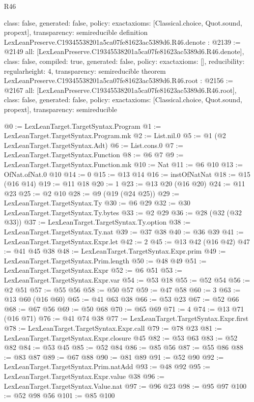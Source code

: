 \begin{lexlean}{R46}
\begin{coremodule}
{  class: false,
  generated: false,
  policy: exact{axioms: [Classical.choice, Quot.sound, propext]},
  transparency: semireducible
}
definition LexLeanPreserve.C19345538201a5ca07fe81623ac5389d6.R46.denote : @2139 := @2149 {
  all: [LexLeanPreserve.C19345538201a5ca07fe81623ac5389d6.R46.denote],
  class: false,
  compiled: true,
  generated: false,
  policy: exact{axioms: []},
  reducibility: regular{height: 4},
  transparency: semireducible
}
theorem LexLeanPreserve.C19345538201a5ca07fe81623ac5389d6.R46.root : @2156 := @2167 {
  all: [LexLeanPreserve.C19345538201a5ca07fe81623ac5389d6.R46.root],
  class: false,
  generated: false,
  policy: exact{axioms: [Classical.choice, Quot.sound, propext]},
  transparency: semireducible
}

@0 := LexLeanTarget.TargetSyntax.Program
@1 := LexLeanTarget.TargetSyntax.Program.mk
@2 := List.nil.{0}
@5 := @1 (@2 LexLeanTarget.TargetSyntax.Adt)
@6 := List.cons.{0}
@7 := LexLeanTarget.TargetSyntax.Function
@8 := @6 @7
@9 := LexLeanTarget.TargetSyntax.Function.mk
@10 := Nat
@11 := @6 @10
@13 := OfNat.ofNat.{0} @10
@14 := 0
@15 := @13 @14
@16 := instOfNatNat
@18 := @15 (@16 @14)
@19 := @11 @18
@20 := 1
@23 := @13 @20 (@16 @20)
@24 := @11 @23
@25 := @2 @10
@28 := @9 (@19 (@24 @25))
@29 := LexLeanTarget.TargetSyntax.Ty
@30 := @6 @29
@32 := @30 LexLeanTarget.TargetSyntax.Ty.bytes
@33 := @2 @29
@36 := @28 (@32 (@32 @33))
@37 := LexLeanTarget.TargetSyntax.Ty.option
@38 := LexLeanTarget.TargetSyntax.Ty.nat
@39 := @37 @38
@40 := @36 @39
@41 := LexLeanTarget.TargetSyntax.Expr.let
@42 := 2
@45 := @13 @42 (@16 @42)
@47 := @41 @45 @38
@48 := LexLeanTarget.TargetSyntax.Expr.prim
@49 := LexLeanTarget.TargetSyntax.Prim.length
@50 := @48 @49
@51 := LexLeanTarget.TargetSyntax.Expr
@52 := @6 @51
@53 := LexLeanTarget.TargetSyntax.Expr.var
@54 := @53 @18
@55 := @52 @54
@56 := @2 @51
@57 := @55 @56
@58 := @50 @57
@59 := @47 @58
@60 := 3
@63 := @13 @60 (@16 @60)
@65 := @41 @63 @38
@66 := @53 @23
@67 := @52 @66
@68 := @67 @56
@69 := @50 @68
@70 := @65 @69
@71 := 4
@74 := @13 @71 (@16 @71)
@76 := @41 @74 @38
@77 := LexLeanTarget.TargetSyntax.Expr.first
@78 := LexLeanTarget.TargetSyntax.Expr.call
@79 := @78 @23
@81 := LexLeanTarget.TargetSyntax.Expr.closure @45
@82 := @53 @63
@83 := @52 @82
@84 := @53 @45
@85 := @52 @84
@86 := @85 @56
@87 := @55 @86
@88 := @83 @87
@89 := @67 @88
@90 := @81 @89
@91 := @52 @90
@92 := LexLeanTarget.TargetSyntax.Prim.natAdd
@93 := @48 @92
@95 := LexLeanTarget.TargetSyntax.Expr.value @38
@96 := LexLeanTarget.TargetSyntax.Value.nat
@97 := @96 @23
@98 := @95 @97
@100 := @52 @98 @56
@101 := @85 @100

\end{coremodule}
\end{lexlean}
